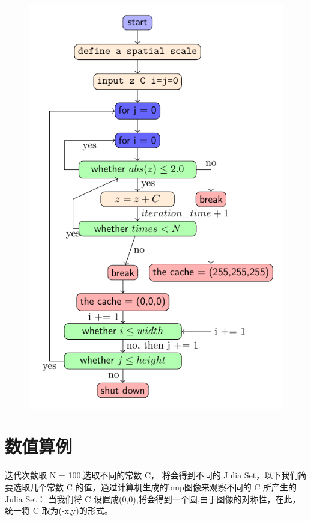 \documentclass{ctexart}
\begin{document}
\begin{figure}[H]
  \centering
  \includegraphics[scale=0.85]{julia.pdf}
\end{figure}

\section{数值算例}

迭代次数取 N = 100,选取不同的常数 C， 将会得到不同的 Julia Set，以下我们简要选取几个常数 C 的值，通过计算机生成的bmp图像来观察不同的 C 所产生的 Julia Set：
当我们将 C 设置成(0,0),将会得到一个圆,由于图像的对称性，在此，统一将 C 取为(-x,y)的形式。
\begin{figure}[H]
\centering
{}
\end{figure}
\end{document}
